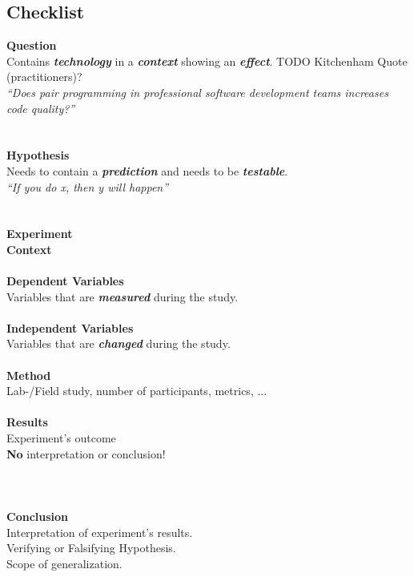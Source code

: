 \newcommand{\exampleQuote}[1]{\small{\textit{``#1''}}}

\subsection{Checklist}

{\large\textbf{Question}}\\
Contains \textbf{\textit{technology}} in a \textbf{\textit{context}} showing an \textbf{\textit{effect}}. TODO Kitchenham Quote (practitioners)?\\
\exampleQuote{Does pair programming in professional software development teams increases code quality?}
\\
\\
\\
{\large\textbf{Hypothesis}}\\
Needs to contain a \textbf{\textit{prediction}} and needs to be \textbf{\textit{testable}}.\\
\exampleQuote{If you do x, then y will happen}
\\
\\
\\
{\large\textbf{Experiment}}\\
\textbf{Context}\\
\\
\textbf{Dependent Variables}\\
Variables that are  \textbf{\textit{measured}} during the study.\\
\\
\textbf{Independent Variables}\\
Variables that are  \textbf{\textit{changed}} during the study.\\
\\
\textbf{Method}\\
Lab-/Field study, number of participants, metrics, ...\\
\\
\textbf{Results}\\
Experiment's outcome\\
\textbf{No} interpretation or conclusion!\\
\\
\\
\\
{\large\textbf{Conclusion}}\\
Interpretation of experiment's results.\\
Verifying or Falsifying Hypothesis.\\
Scope of generalization.








